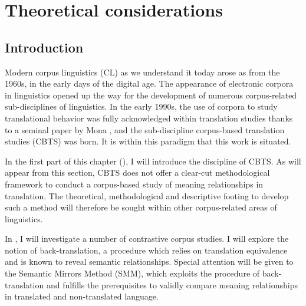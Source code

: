 \chapter{Theoretical considerations}
\hypertarget{Chapter2Theoretical}{}\section{\label{sec:2.1}  Introduction}

Modern corpus linguistics (CL) as we understand it today arose as from the 1960s, in the early days of the digital age. The appearance of electronic corpora in linguistics opened up the way for the development of numerous corpus-related sub-disciplines of linguistics. In the early 1990s, the use of corpora to study translational behavior was fully acknowledged within translation studies thanks to a seminal paper by Mona \citet{baker_corpus_1993}, and the sub-discipline corpus-based translation studies (CBTS) was born. It is within this paradigm that this work is situated.



In the first part of this chapter (), I will introduce the discipline of CBTS. As will appear from this section, CBTS does not offer a clear-cut methodological framework to conduct a corpus-based study of meaning relationships in translation. The theoretical, methodological and descriptive footing to develop such a method will therefore be sought within other corpus-related areas of linguistics.



In , I will investigate a number of contrastive corpus studies. I will explore the notion of back-translation, a procedure which relies on translation equivalence and is known to reveal semantic relationships. Special attention will be given to the Semantic Mirrors Method (SMM), which exploits the procedure of back-translation and fulfills the prerequisites to validly compare meaning relationships in translated and non-translated language.



